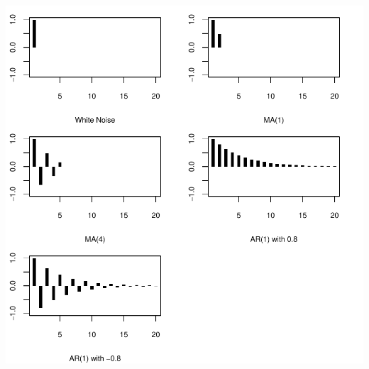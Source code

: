 \documentclass[a4paper]{article}
\renewcommand{\~}{\perispomeni}%
\begin{document}
\begin{center}
\includegraphics{Companion-017}
\end{center}
\end{document}
